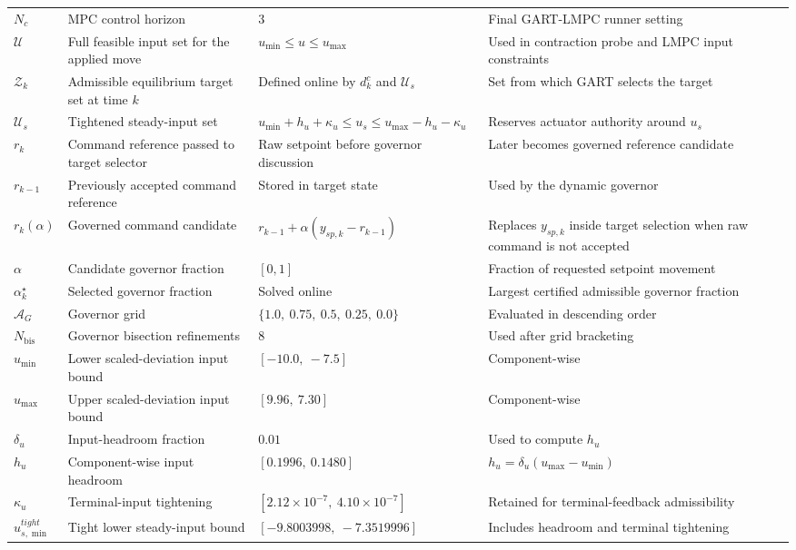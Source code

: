 \documentclass[11pt]{article}
\begin{document}
\begin{longtable}{>{\raggedright\arraybackslash}p{}>{\raggedright\arraybackslash}p{}>{\raggedright\arraybackslash}p{}>{\raggedright\arraybackslash}p{}}
$N_c$ & MPC control horizon & $3$ & Final GART-LMPC runner setting \\
$\mathcal U$ & Full feasible input set for the applied move & $u_{\min}\le u\le u_{\max}$ & Used in contraction probe and LMPC input constraints \\
$\mathcal Z_k$ & Admissible equilibrium target set at time $k$ & Defined online by $d^c_k$ and $\mathcal U_s$ & Set from which GART selects the target \\
$\mathcal U_s$ & Tightened steady-input set & $u_{\min}+h_u+\kappa_u\le u_s\le u_{\max}-h_u-\kappa_u$ & Reserves actuator authority around $u_s$ \\
$r_k$ & Command reference passed to target selector & Raw setpoint before governor discussion & Later becomes governed reference candidate \\
$r_{k-1}$ & Previously accepted command reference & Stored in target state & Used by the dynamic governor \\
$r_k(\alpha)$ & Governed command candidate & $r_{k-1}+\alpha(y_{sp,k}-r_{k-1})$ & Replaces $y_{sp,k}$ inside target selection when raw command is not accepted \\
$\alpha$ & Candidate governor fraction & $[0,1]$ & Fraction of requested setpoint movement \\
$\alpha_k^\star$ & Selected governor fraction & Solved online & Largest certified admissible governor fraction \\
$\mathcal A_G$ & Governor grid & $\{1.0,\ 0.75,\ 0.5,\ 0.25,\ 0.0\}$ & Evaluated in descending order \\
$N_{\mathrm{bis}}$ & Governor bisection refinements & $8$ & Used after grid bracketing \\
$u_{\min}$ & Lower scaled-deviation input bound & $[-10.0,\ -7.5]$ & Component-wise \\
$u_{\max}$ & Upper scaled-deviation input bound & $[9.96,\ 7.30]$ & Component-wise \\
$\delta_u$ & Input-headroom fraction & $0.01$ & Used to compute $h_u$ \\
$h_u$ & Component-wise input headroom & $[0.1996,\ 0.1480]$ & $h_u=\delta_u(u_{\max}-u_{\min})$ \\
$\kappa_u$ & Terminal-input tightening & $[2.12{\times}10^{-7},\ 4.10{\times}10^{-7}]$ & Retained for terminal-feedback admissibility \\
$u_{s,\min}^{tight}$ & Tight lower steady-input bound & $[-9.8003998,\ -7.3519996]$ & Includes headroom and terminal tightening \\

\end{longtable}
\end{document}
